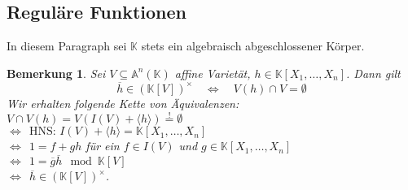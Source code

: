 \documentclass[11pt]{book}
\newtheorem{remark}[theorem]{Bemerkung}
\theoremstyle{nonumberbreak}
\newenvironment{pr}[1][]{\ifthenelse{\equal{#1}{}}{\proof}{\proof[#1]}\rm}{\endproof}
\begin{document}
\begin{spacing}{1.3}
\renewcommand*\thesection{§ \arabic{section}\quad}
\section{Reguläre Funktionen} %
\renewcommand*\thesection{\arabic{section}}

In diesem Paragraph sei $\mathbb{K}$ stets ein algebraisch abgeschlossener Körper.

\begin{remark} %
Sei $V \subseteq \mathbb{A}^n(\mathbb{K})$ affine Varietät, $h \in \mathbb{K}[X_1, \ldots, X_n]$. Dann gilt
$$ \overline{h} \in \left(\mathbb{K}[V]\right)^{\times} \quad \Longleftrightarrow \quad V(h) \cap V = \emptyset$$
\begin{pr}
Wir erhalten folgende Kette von Äquivalenzen:\\
$V \cap V(h)=V(I(V)+\langle h \rangle ) \overset{!}{=} \emptyset$\\
$\Longleftrightarrow \ \ \textrm{HNS: } I(V) + \langle h \rangle = \mathbb{K}[X_1, \ldots, X_n]$ \\
$\Longleftrightarrow \ \ 1 = f + gh$ für ein $f \in I(V)$ und $g \in \mathbb{K}[X_1, \ldots, X_n]$\\
$\Longleftrightarrow \ \ 1 = \overline{g} \overline{h} \mod \mathbb{K}[V]$\\
$\Longleftrightarrow \ \ \overline{h} \in \left(\mathbb{K}[V]\right)^{\times}$.
\end{pr}
\end{remark}


\end{spacing}
\end{document}
